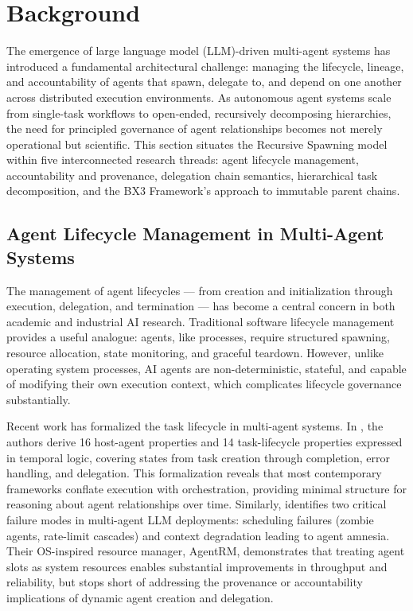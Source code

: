 \section{Background}

The emergence of large language model (LLM)-driven multi-agent systems has introduced a fundamental architectural challenge: managing the lifecycle, lineage, and accountability of agents that spawn, delegate to, and depend on one another across distributed execution environments. As autonomous agent systems scale from single-task workflows to open-ended, recursively decomposing hierarchies, the need for principled governance of agent relationships becomes not merely operational but scientific. This section situates the Recursive Spawning model within five interconnected research threads: agent lifecycle management, accountability and provenance, delegation chain semantics, hierarchical task decomposition, and the BX3 Framework's approach to immutable parent chains.

\subsection{Agent Lifecycle Management in Multi-Agent Systems}

The management of agent lifecycles — from creation and initialization through execution, delegation, and termination — has become a central concern in both academic and industrial AI research. Traditional software lifecycle management provides a useful analogue: agents, like processes, require structured spawning, resource allocation, state monitoring, and graceful teardown. However, unlike operating system processes, AI agents are non-deterministic, stateful, and capable of modifying their own execution context, which complicates lifecycle governance substantially.

Recent work has formalized the task lifecycle in multi-agent systems. In \cite{agentlifecycle}, the authors derive 16 host-agent properties and 14 task-lifecycle properties expressed in temporal logic, covering states from task creation through completion, error handling, and delegation. This formalization reveals that most contemporary frameworks conflate execution with orchestration, providing minimal structure for reasoning about agent relationships over time. Similarly, \cite{agentrm} identifies two critical failure modes in multi-agent LLM deployments: scheduling failures (zombie agents, rate-limit cascades) and context degradation leading to agent amnesia. Their OS-inspired resource manager, AgentRM, demonstrates that treating agent slots as system resources enables substantial improvements in throughput and reliability, but stops short of addressing the provenance or accountability implications of dynamic agent creation and delegation.

